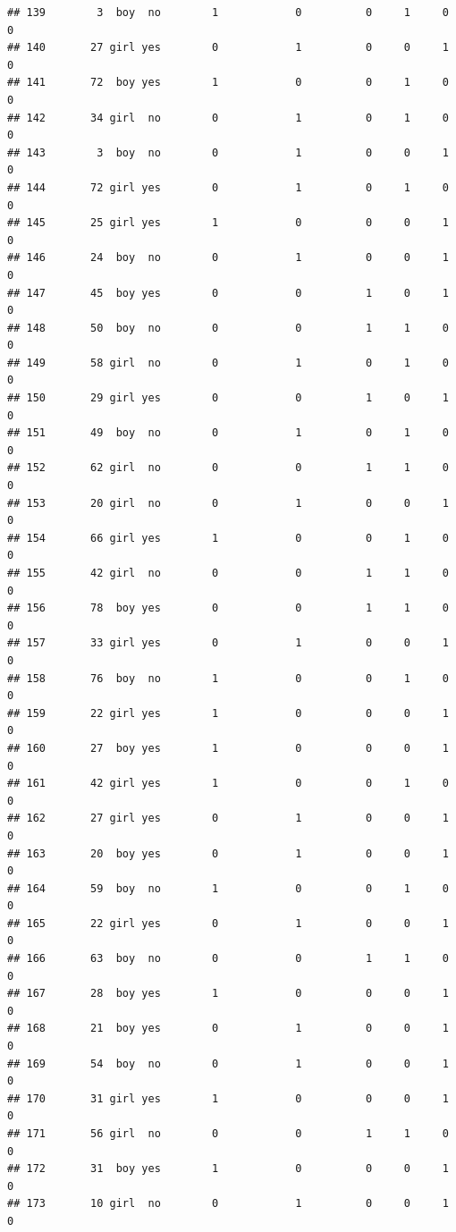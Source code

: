 \documentclass[man]{apa6}
\begin{document}
\begin{verbatim}
## 139        3  boy  no        1            0          0     1     0     0
## 140       27 girl yes        0            1          0     0     1     0
## 141       72  boy yes        1            0          0     1     0     0
## 142       34 girl  no        0            1          0     1     0     0
## 143        3  boy  no        0            1          0     0     1     0
## 144       72 girl yes        0            1          0     1     0     0
## 145       25 girl yes        1            0          0     0     1     0
## 146       24  boy  no        0            1          0     0     1     0
## 147       45  boy yes        0            0          1     0     1     0
## 148       50  boy  no        0            0          1     1     0     0
## 149       58 girl  no        0            1          0     1     0     0
## 150       29 girl yes        0            0          1     0     1     0
## 151       49  boy  no        0            1          0     1     0     0
## 152       62 girl  no        0            0          1     1     0     0
## 153       20 girl  no        0            1          0     0     1     0
## 154       66 girl yes        1            0          0     1     0     0
## 155       42 girl  no        0            0          1     1     0     0
## 156       78  boy yes        0            0          1     1     0     0
## 157       33 girl yes        0            1          0     0     1     0
## 158       76  boy  no        1            0          0     1     0     0
## 159       22 girl yes        1            0          0     0     1     0
## 160       27  boy yes        1            0          0     0     1     0
## 161       42 girl yes        1            0          0     1     0     0
## 162       27 girl yes        0            1          0     0     1     0
## 163       20  boy yes        0            1          0     0     1     0
## 164       59  boy  no        1            0          0     1     0     0
## 165       22 girl yes        0            1          0     0     1     0
## 166       63  boy  no        0            0          1     1     0     0
## 167       28  boy yes        1            0          0     0     1     0
## 168       21  boy yes        0            1          0     0     1     0
## 169       54  boy  no        0            1          0     0     1     0
## 170       31 girl yes        1            0          0     0     1     0
## 171       56 girl  no        0            0          1     1     0     0
## 172       31  boy yes        1            0          0     0     1     0
## 173       10 girl  no        0            1          0     0     1     0

\end{verbatim}
\end{document}
